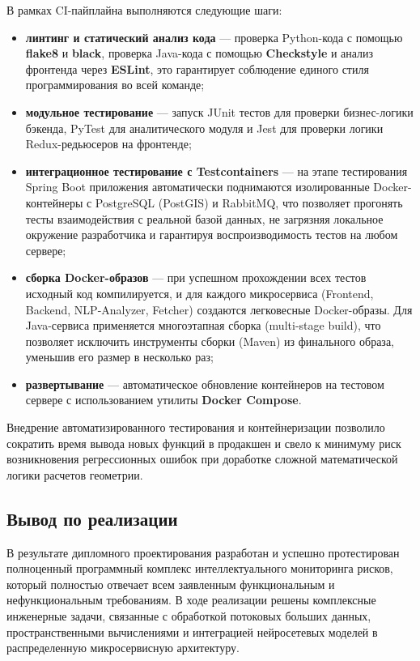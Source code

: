 В рамках CI-пайплайна выполняются следующие шаги:
\begin{itemize}
    \item \textbf{линтинг и статический анализ кода} --- проверка Python-кода с помощью \textbf{flake8} и \textbf{black}, проверка Java-кода с помощью \textbf{Checkstyle} и анализ фронтенда через \textbf{ESLint}, это гарантирует соблюдение единого стиля программирования во всей команде;
    \item \textbf{модульное тестирование} --- запуск JUnit тестов для проверки бизнес-логики бэкенда, PyTest для аналитического модуля и Jest для проверки логики Redux-редьюсеров на фронтенде;
    \item \textbf{интеграционное тестирование с Testcontainers} --- на этапе тестирования Spring Boot приложения автоматически поднимаются изолированные Docker-контейнеры с PostgreSQL (PostGIS) и RabbitMQ, что позволяет прогонять тесты взаимодействия с реальной базой данных, не загрязняя локальное окружение разработчика и гарантируя воспроизводимость тестов на любом сервере;
    \item \textbf{сборка Docker-образов} --- при успешном прохождении всех тестов исходный код компилируется, и для каждого микросервиса (Frontend, Backend, NLP-Analyzer, Fetcher) создаются легковесные Docker-образы. Для Java-сервиса применяется многоэтапная сборка (multi-stage build), что позволяет исключить инструменты сборки (Maven) из финального образа, уменьшив его размер в несколько раз;
    \item \textbf{развертывание} --- автоматическое обновление контейнеров на тестовом сервере с использованием утилиты \textbf{Docker Compose}.
\end{itemize}

Внедрение автоматизированного тестирования и контейнеризации позволило сократить время вывода новых функций в продакшен и свело к минимуму риск возникновения регрессионных ошибок при доработке сложной математической логики расчетов геометрии.

\subsection{Вывод по реализации}

В результате дипломного проектирования разработан и успешно протестирован полноценный программный комплекс интеллектуального мониторинга рисков, который полностью отвечает всем заявленным функциональным и нефункциональным требованиям. В ходе реализации решены комплексные инженерные задачи, связанные с обработкой потоковых больших данных, пространственными вычислениями и интеграцией нейросетевых моделей в распределенную микросервисную архитектуру.

